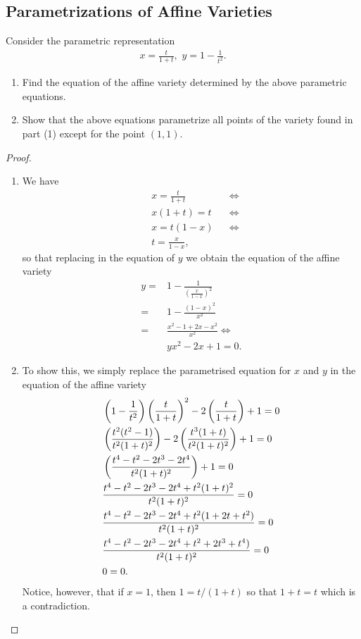 \subsection{Parametrizations of Affine Varieties}


\begin{exercise}{4}
Consider the parametric representation
\begin{align*}
    x=\frac{t}{1+t},\,\,y=1-\frac{1}{t^2}.
\end{align*}
\begin{enumerate}
    \item Find the equation of the affine variety determined by the above parametric equations.
    \item Show that the above equations parametrize all points of the variety found in part (1) except for the point $(1,1)$.
\end{enumerate}
\end{exercise}
\begin{proof}
\begin{enumerate}
    \item We have 
    \begin{align*}
        &x = \frac{t}{1+t} &&\iff\\
        &x(1+t) = t &&\iff\\
        &x = t(1-x) &&\iff\\
        &t = \frac{x}{1-x},
    \end{align*}
    so that replacing in the equation of $y$ we obtain the equation of the affine variety
    \begin{align*}
        y =& 1 -\frac{1}{\left(\frac{x}{1-x}\right)^2}\\
        =& 1-\frac{(1-x)^2}{x^2}\\
        =& \frac{x^2-1+2x-x^2}{x^2}\iff\\
        &yx^2-2x+1=0.
    \end{align*}
    \item To show this, we simply replace the parametrised equation for $x$ and $y$ in the equation of the affine variety
    \begin{align*}
        &\left( 1-\frac{1}{t^2}\right)\left( \frac{t}{1+t}\right)^2-2\left( \frac{t}{1+t}\right)+1=0\\
        &\left( \frac{t^2(t^2-1)}{t^2(1+t)^2}\right)-2\left( \frac{t^3(1+t)}{t^2(1+t)^2}\right)+1=0\\
        &\left( \frac{t^4-t^2-2t^3-2t^4}{t^2(1+t)^2}\right)+1=0\\
        &\frac{t^4-t^2-2t^3-2t^4+t^2(1+t)^2}{t^2(1+t)^2}=0\\
        &\frac{t^4-t^2-2t^3-2t^4+t^2(1+2t+t^2)}{t^2(1+t)^2}=0\\
        &\frac{t^4-t^2-2t^3-2t^4+t^2+2t^3+t^4)}{t^2(1+t)^2}=0\\
        &0=0.
    \end{align*}
    Notice, however, that if $x=1$, then $1=t/(1+t)$ so that $1+t=t$ which is a contradiction.
\end{enumerate}
\end{proof}

